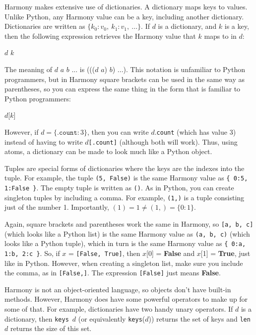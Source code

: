 \documentclass{report}
\newenvironment{code}{
\tcolorbox
}{
\endtcolorbox
}
\begin{document}
Harmony makes extensive use of dictionaries.
A dictionary maps keys to values.
Unlike Python, any Harmony value can be a key, including another
dictionary.
Dictionaries are written as
$\{ k_0: v_0, ~ k_1: v_1, ~ ... \}$.
If $d$ is a dictionary, and $k$ is a key, then the
following expression retrieves the Harmony value that $k$ maps to in $d$:
\begin{code}
$d$ $k$
\end{code}
The meaning of $d$ $a$ $b$ $...$ is ((($d$ $a$) $b$) $...$).
This notation is unfamiliar to Python programmers,
but in Harmony square brackets can be used
in the same way as parentheses, so you can express the same thing in the form
that is familiar to Python programmers:
\begin{code}
$d$[$k$]
\end{code}
However, if $d = \{ \mathtt{.count}: 3 \}$, then you can write
$d$.\texttt{count} (which has value 3) instead of having to write
$d$\texttt{[.count]} (although both will work).
Thus, using atoms, a dictionary can be made to look much like a Python object.

Tuples are special forms of dictionaries where the keys are
the indexes into the tuple.  For example, the tuple
\texttt{(5, False)} is the same Harmony value as
\texttt{\{ 0:5, 1:False \}}.
The empty tuple is written as \texttt{()}.
As in Python, you can create singleton tuples by including a comma.
For example, \texttt{(1,)} is a tuple consisting just of the number 1.
Importantly, $(1) = 1 \ne (1,) = \{ 0:1 \}$.

Again, square brackets and parentheses work the same in Harmony, so
\texttt{[a, b, c]} (which looks like a Python list)
is the same Harmony value as \texttt{(a, b, c)} (which looks like a Python tuple),
which in turn is the same Harmony value as \texttt{\{ 0:a, 1:b, 2:c \}}.
So, if $x$ = \texttt{[False, True]},
then $x$[0] = \textbf{False} and $x$[1] = \textbf{True}, just like in Python.
However, when creating a singleton list, make sure you include the
comma, as in \texttt{[False,]}.  The expression \texttt{[False]} just means
\textbf{False}.

Harmony is not an object-oriented language, so objects don't have
built-in methods.  However, Harmony does have some powerful operators to
make up for some of that.
For example, dictionaries have two handy unary operators.
If $d$ is a
dictionary, then \texttt{keys}~$d$ (or equivalently \texttt{keys}($d$))
returns the set of keys and \texttt{len}~$d$ returns the size of
this set.
\end{document}
